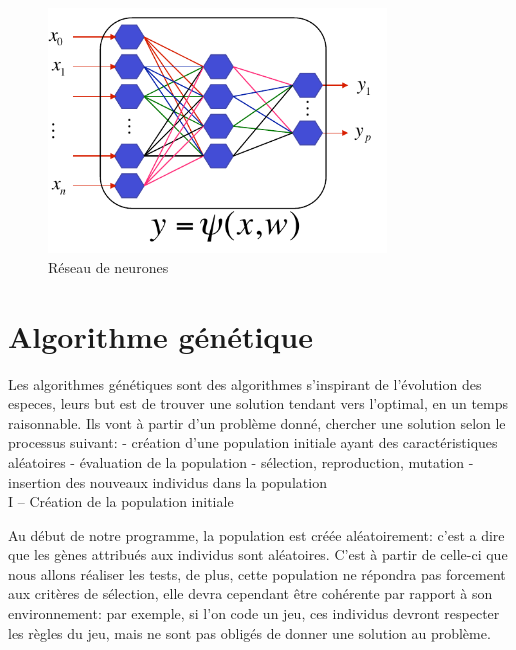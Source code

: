 \begin{figure}[H]
    \centering
    \includegraphics[width=0.8\textwidth]{./pictures/reseau_de_neurones.png}
    \caption{Réseau de neurones}
\end{figure}



\section{Algorithme génétique}
Les algorithmes génétiques sont des algorithmes s'inspirant de l'évolution des especes, leurs but est de trouver une solution tendant vers l'optimal, en un temps raisonnable. Ils vont à partir d'un problème donné, chercher une solution selon le processus suivant: 
- création d'une population initiale ayant des caractéristiques aléatoires
- évaluation de la population
- sélection, reproduction, mutation
- insertion des nouveaux individus dans la population\\


I – Création de la population initiale

	Au début de notre programme, la population est créée aléatoirement: c'est a dire que les gènes attribués aux individus sont aléatoires. C'est à partir de celle-ci que nous allons réaliser les tests, de plus, cette population ne répondra pas forcement aux critères de sélection, elle devra cependant être cohérente par rapport à son environnement: par exemple, si l'on code un jeu, ces individus devront respecter les règles du jeu, mais ne sont pas obligés de donner une solution au problème.\\

